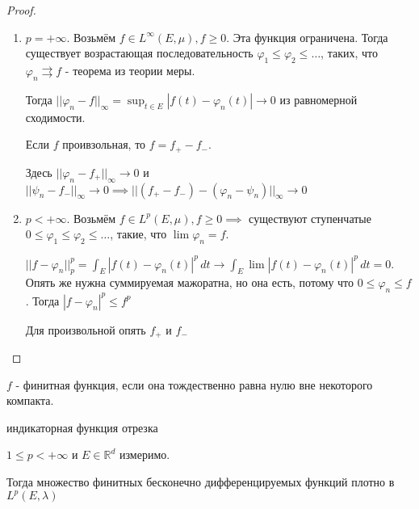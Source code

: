 \begin{proof}
    \begin{enumerate}
        \item {
            $p = +\infty$. Возьмём $f \in L^\infty (E, \mu), f \geqslant 0$. Эта функция ограничена.
            Тогда существует возрастающая последовательность $\varphi_1 \leqslant \varphi_2 \leqslant \ldots$, таких, что $\varphi_n \rightrightarrows f$ - теорема из теории меры.

            Тогда $||\varphi_n - f||_{\infty} = \sup_{t \in E} |f(t) - \varphi_n(t)| \rightarrow 0$ из равномерной сходимости.

            Если $f$ проивзольная, то $f = f_{+} - f_{-}$. 
            
            Здесь $||\varphi_n - f_{+}||_\infty \rightarrow 0$ и $||\psi_n - f_{-}||_\infty \rightarrow 0 \implies ||(f_{+} - f_{-}) - (\varphi_n - \psi_n)||_\infty \rightarrow 0$
        }
        \item {
            $p < +\infty$. Возьмём $f \in L^p (E, \mu), f \geqslant 0 \implies $ существуют ступенчатые $0 \leqslant \varphi_1 \leqslant \varphi_2 \leqslant \ldots$, такие, что $\lim \varphi_n = f$.

            $||f - \varphi_n||_p^p = \int_E |f(t) - \varphi_n(t) |^p \, dt \rightarrow \int_E \lim |f(t) - \varphi_n(t) |^p \, dt = 0$.
            Опять же нужна суммируемая мажоратна, но она есть, потому что $0 \leqslant \varphi_n \leqslant f$. Тогда $|f - \varphi_n|^p \leqslant f^p$

            Для произвольной опять $f_{+}$ и $f_{-}$
        }
    \end{enumerate}
\end{proof}

\begin{definition}
    $f$ - финитная функция, если она тождественно равна нулю вне некоторого компакта.
    \begin{example}
        индикаторная функция отрезка
    \end{example}
\end{definition}

\begin{theorem}
    $1 \leqslant p < +\infty$ и $E \in \mathbb{R}^d$ измеримо.

    Тогда множество финитных бесконечно дифференцируемых функций плотно в $L^p (E, \lambda)$
\end{theorem}

